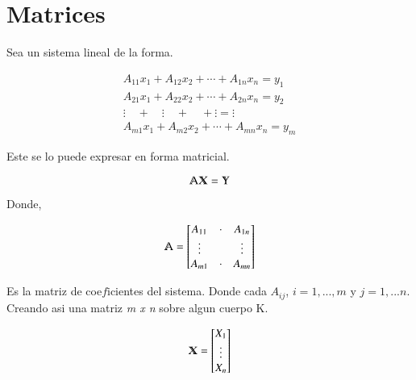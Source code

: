 \documentclass[12pt]{article}
\begin{document}
 
 
 
 

\section*{Matrices}
 
 
Sea un sistema lineal de la forma.

\begin{equation}
  \label{eq:t}
  \begin{aligned}
A_{11}x_{1}+A_{12}x_{2}+ \cdots + A_{1n}x_{n} = y_{1} \\
A_{21}x_{1}+A_{22}x_{2}+ \cdots + A_{2n}x_{n} = y_{2} \\
 \vdots \quad + \quad \vdots  \quad + \quad + \vdots = \vdots \\
A_{m1}x_{1}+A_{m2}x_{2}+ \cdots + A_{mn}x_{n} = y_{m} 
  \end{aligned}
\end{equation}

Este se lo puede expresar en forma matricial. 

\begin{equation}
\varmathbb{A X} = \varmathbb{Y}
\end{equation}

Donde, 


\[
\varmathbb{A} = \begin{bmatrix}
	A_{11} & \cdot &  A_{1n}\\
    \vdots &  &  \vdots \\
   A_{m1} & \cdot & A_{mn} \\
\end{bmatrix}
\]

Es la matriz de coe$f$icientes del sistema. Donde cada $A_{ij}$, $i=1,...,m$ y $j=1,...n$. Creando asi una matriz \textit{m x n} sobre algun cuerpo K.
 
\[
\varmathbb{X} = \begin{bmatrix}
	X_{1} \\
    \vdots \\
   X_{n}  \\
\end{bmatrix}
\]
\end{document}
